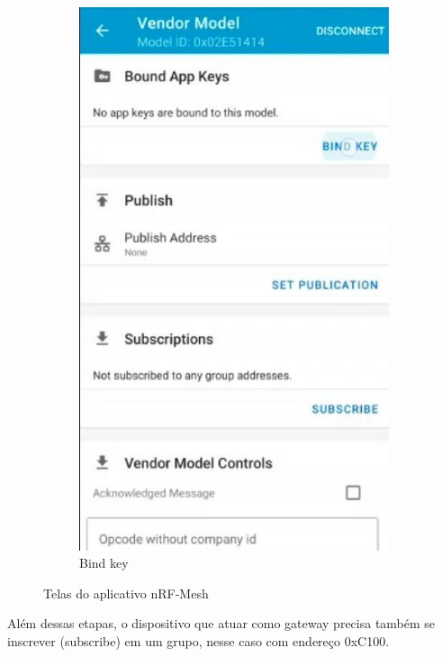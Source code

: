 \documentclass[../monografia.tex]{subfiles}
\begin{document}
\begin{figure}[h]
\begin{subfigure}[b]{0.22\textwidth}
		\includegraphics[width=\textwidth]{mesh-bind-4}
		\caption{Bind key}
		\label{fig:mesh-bind-4}
	\end{subfigure}
	\caption{Telas do aplicativo nRF-Mesh}
	\label{fig:app-nrf-mesh}
\end{figure}

Além dessas etapas, o dispositivo que atuar como gateway precisa também se inscrever (subscribe) em um grupo, nesse caso com endereço 0xC100. 
\end{document}
